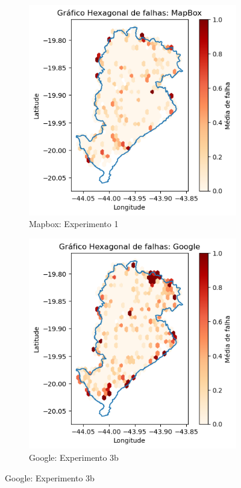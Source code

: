 \begin{figure}[ht]
  \centering
  \begin{subfigure}[b]{0.45\textwidth}
    \includegraphics[width=\textwidth]{Figuras/falhasMapboxBHexpG.png}
    \caption{Mapbox: Experimento 1}
    \label{fig:falhasmapboxBexp}
  \end{subfigure}
  \hfill
  \begin{subfigure}[b]{0.45\textwidth}
    \includegraphics[width=\textwidth]{Figuras/falhasGoogleBHexpG.png}
    \caption{Google: Experimento 3b}
    \label{fig:falhasgoogleBexp}
  \end{subfigure}


\end{figure}
